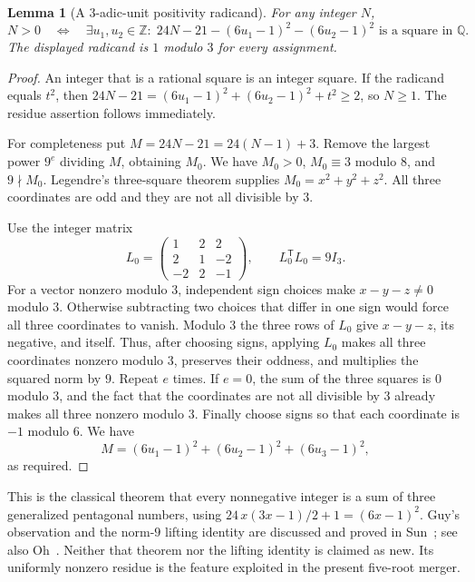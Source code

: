 \documentclass[11pt]{article}
\newtheorem{lemma}[theorem]{Lemma}
\theoremstyle{remark}\newtheorem{remark}[theorem]{Remark}
\newcommand{\Z}{\mathbb Z}\newcommand{\Q}{\mathbb Q}\newcommand{\N}{\mathbb N}
\begin{document}
\begin{lemma}[A $3$-adic-unit positivity radicand]\label{lem:pentagonal}
For any integer $N$,
\[
 N>0\quad\Longleftrightarrow\quad
 \exists u_1,u_2\in\Z:\;
 24N-21-(6u_1-1)^2-(6u_2-1)^2
 \text{ is a square in }\Q.
\]
The displayed radicand is $1$ modulo $3$ for every assignment.
\end{lemma}
\begin{proof}
An integer that is a rational square is an integer square. If the
radicand equals $t^2$, then
$24N-21=(6u_1-1)^2+(6u_2-1)^2+t^2\ge2$, so $N\ge1$.
The residue assertion follows immediately.

For completeness put $M=24N-21=24(N-1)+3$. Remove the largest power
$9^e$ dividing $M$, obtaining $M_0$. We have $M_0>0$, $M_0\equiv3$
modulo $8$, and $9\nmid M_0$. Legendre's three-square theorem supplies
$M_0=x^2+y^2+z^2$. All three coordinates are odd and they are not all
divisible by $3$.

Use the integer matrix
\[
 L_0=\begin{pmatrix}1&2&2\\2&1&-2\\-2&2&-1\end{pmatrix},
 \qquad L_0^{\mathsf T}L_0=9I_3.
\]
For a vector nonzero modulo $3$, independent sign choices make
$x-y-z\ne0$ modulo $3$. Otherwise subtracting two choices that differ
in one sign would force all three coordinates to vanish. Modulo $3$ the
three rows of $L_0$ give $x-y-z$, its negative, and itself. Thus, after
choosing signs, applying $L_0$ makes all three coordinates nonzero modulo
$3$, preserves their oddness, and multiplies the squared norm by $9$.
Repeat $e$ times. If $e=0$, the sum of the three squares is $0$ modulo
$3$, and the fact that the coordinates are not all divisible by $3$
already makes all three nonzero modulo $3$. Finally choose signs so that
each coordinate is $-1$ modulo $6$. We have
\[
 M=(6u_1-1)^2+(6u_2-1)^2+(6u_3-1)^2,
\]
as required.
\end{proof}

This is the classical theorem that every nonnegative integer is a sum of
three generalized pentagonal numbers, using
$24\,x(3x-1)/2+1=(6x-1)^2$. Guy's observation and the norm-$9$
lifting identity are discussed and proved in Sun~\cite{sunpent}; see also
Oh~\cite{oh}. Neither that theorem nor the lifting identity is claimed as
new. Its uniformly nonzero residue is the feature exploited in the present
five-root merger.
\end{document}

